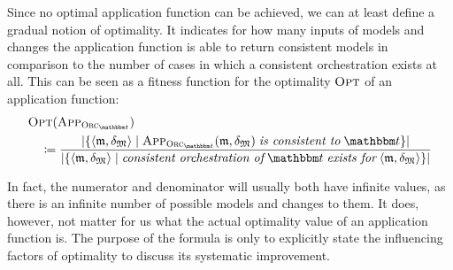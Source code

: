 Since no optimal application function can be achieved, we can at least define a gradual notion of optimality.
It indicates for how many inputs of models and changes the application function is able to return consistent models in comparison to the number of cases in which a consistent orchestration exists at all.
This can be seen as a fitness function for the optimality $\textsc{Opt}$ of an application function:
\begin{align*}
    &
    \function{Opt}(\appfunction{\orcfunction{\transformationset{T}}}) \\
    & \formulaskip
    \equalsperdefinition 
    \frac{
        \abs{\setted{%
        \tupled{\modeltuple{m},\changetuple{\metamodeltuple{M}}} \mid \appfunction{\orcfunction{\transformationset{T}}}(\modeltuple{m}, \changetuple{\metamodeltuple{M}}) \mathtextspacearound{is consistent to} \transformationset{T}}}
    }{
        \abs{\setted{\tupled{\modeltuple{m},\changetuple{\metamodeltuple{M}}} \mid \mathtextspaceafter{consistent orchestration of} \transformationset{T} \mathtextspacearound{exists for} \tupled{\modeltuple{m}, \changetuple{\metamodeltuple{M}}}}}
    }
\end{align*}

In fact, the numerator and denominator will usually both have infinite values, as there is an infinite number of possible models and changes to them.
It does, however, not matter for us what the actual optimality value of an application function is.
The purpose of the formula is only to explicitly state the influencing factors of optimality to discuss its systematic improvement.

